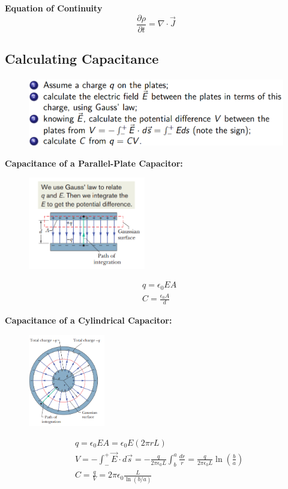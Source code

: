 \documentclass[11pt, a4paper]{article}
\begin{document}
\textbf{Equation of Continuity} $$\frac{\partial \rho}{\partial t} = \nabla \cdot \vec{J}$$ 

\subsection{Calculating Capacitance}
\begin{figure}[htbp]
    \centering
    \includegraphics[height = 3cm]{12.png}
\end{figure}


\textbf{Capacitance of a Parallel-Plate Capacitor:}
\begin{figure}[htbp]
    \centering
    \includegraphics[height = 4cm]{13.png}
\end{figure}
$$\begin{aligned}
    &q = \epsilon_0EA\\
    &C = \frac{\epsilon_0 A}{d}
\end{aligned}$$

\textbf{Capacitance of a Cylindrical Capacitor:}
\begin{figure}[htbp]
    \centering
    \includegraphics[height = 4cm]{14.png}
\end{figure}
$$\begin{aligned}
    &q=\epsilon_0EA=\epsilon_0E(2\pi rL)\\
    &V=-\int_{-}^{+}\vec{E}\cdot d\vec{s}=-\frac q{2\pi\epsilon_0L}\int_{b}^{a}\frac{dr}r=\frac q{2\pi\epsilon_0L}\ln\left(\frac ba\right)\\
    &C=\frac qV=2\pi\epsilon_0\frac L{\ln(b/a)}
\end{aligned}$$
\end{document}
